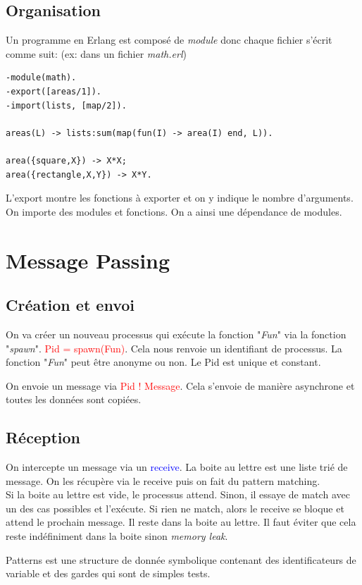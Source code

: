 \documentclass{report}
\begin{document}
\subsection{Organisation}
Un programme en Erlang est composé de \textit{module}	 donc chaque fichier s'écrit comme suit: (ex: dans un fichier \textit{math.erl})
\begin{lstlisting}[escapechar=\%]
-module(math).
-export([areas/1]).
-import(lists, [map/2]). 

areas(L) -> lists:sum(map(fun(I) -> area(I) end, L)).

area({square,X}) -> X*X;
area({rectangle,X,Y}) -> X*Y.
\end{lstlisting}
L'export montre les fonctions à exporter et on y indique le nombre d'arguments. On importe des modules et fonctions. On a ainsi une dépendance de modules.

\section{Message Passing}
\subsection{Création et envoi}
On va créer un nouveau processus qui exécute la fonction "\textit{Fun}" via la fonction "\textit{spawn}". \textcolor{red}{Pid = spawn(Fun)}. Cela nous renvoie un identifiant de processus. La fonction "\textit{Fun}" peut être anonyme ou non. Le Pid est unique et constant. \par 
On envoie un message via \textcolor{red}{Pid ! Message}. Cela s'envoie de manière asynchrone et toutes les données sont copiées.

\subsection{Réception}
On intercepte un message via un \textcolor{blue}{receive}. La boite au lettre est une liste trié de message. On les récupère via le receive puis on fait du pattern matching.\\
Si la boite au lettre est vide, le processus attend. Sinon, il essaye de match avec un des cas possibles et l'exécute. Si rien ne match, alors le receive se bloque et attend le prochain message. Il reste dans la boite au lettre. Il faut éviter que cela reste indéfiniment dans la boite sinon \textit{memory leak}. \par
Patterns est une structure de donnée symbolique contenant des identificateurs de variable et des gardes qui sont de simples tests.
\end{document}

